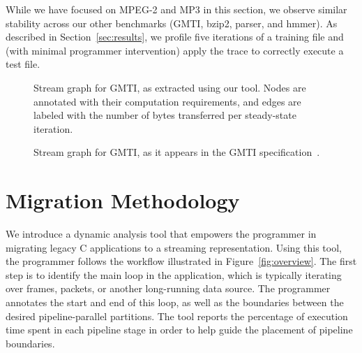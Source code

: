 % 

While we have focused on MPEG-2 and MP3 in this section, we observe
similar stability across our other benchmarks (GMTI, bzip2, parser,
and hmmer).  As described in Section~\ref{sec:results}, we profile
five iterations of a training file and (with minimal programmer
intervention) apply the trace to correctly execute a test file.

\begin{figure}[t]
\centering
\hspace{0in}
\caption[Stream graph for GMTI, as extracted using our tool]{Stream
  graph for GMTI, as extracted using our tool.  Nodes are annotated
  with their computation requirements, and edges are labeled with the
  number of bytes transferred per steady-state
  iteration.\protect\label{fig:gmti-graph-tool}}
\end{figure}

\begin{figure}[t]
\centering
\hspace{0in}
\caption[Stream graph for GMTI, as it appears in the GMTI
  specification]{Stream graph for GMTI, as it appears in the GMTI
  specification~\protect\cite{reuther03gmti}.\protect\label{fig:gmti-graph-spec}}
\vspace{-6pt}
\end{figure}

\section{Migration Methodology}
\label{sec:workflow}

We introduce a dynamic analysis tool that empowers the programmer in
migrating legacy C applications to a streaming representation.  Using
this tool, the programmer follows the workflow illustrated in
Figure~\ref{fig:overview}.  The first step is to identify the main
loop in the application, which is typically iterating over frames,
packets, or another long-running data source.  The programmer
annotates the start and end of this loop, as well as the boundaries
between the desired pipeline-parallel partitions.  The tool reports
the percentage of execution time spent in each pipeline stage in order
to help guide the placement of pipeline boundaries.

